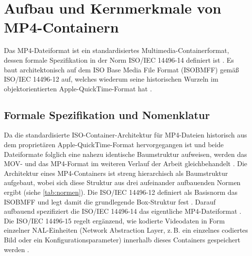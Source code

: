\section{Aufbau und Kernmerkmale von MP4-Containern}
\label{kap:aufbau_mp4}
\label{sec:aufbau_mp4}

Das MP4-Dateiformat ist ein standardisiertes Multimedia-Containerformat, dessen formale Spezifikation in der Norm ISO/IEC 14496-14 definiert ist \cite{iso_14496-14_2020}. Es baut architektonisch auf dem ISO Base Media File Format (ISOBMFF) gemäß ISO/IEC 14496-12 auf, welches wiederum seine historischen Wurzeln im objektorientierten Apple-QuickTime-Format hat \cite{apple_quicktime_2001}. 


\subsection{Formale Spezifikation und Nomenklatur}

Da die standardisierte ISO-Container-Architektur für MP4-Dateien historisch aus dem proprietären Apple-QuickTime-Format hervorgegangen ist und beide Dateiformate folglich eine nahezu identische Baumstruktur aufweisen, werden das MOV- und das MP4-Format im weiteren Verlauf der Arbeit gleichbehandelt \cite{apple_quicktime_2001, iso_14496-12_2022}. Die Architektur eines MP4-Containers ist streng hierarchisch als Baumstruktur aufgebaut, wobei sich diese Struktur aus drei aufeinander aufbauenden Normen ergibt (siehe \cref{tab:normen}). Die ISO/IEC 14496-12 definiert als Basisnorm das ISOBMFF und legt damit die grundlegende Box-Struktur fest \cite{iso_14496-12_2022}. Darauf aufbauend spezifiziert die ISO/IEC 14496-14 das eigentliche MP4-Dateiformat \cite{iso_14496-14_2020}. Die ISO/IEC 14496-15 regelt ergänzend, wie kodierte Videodaten in Form einzelner NAL-Einheiten (Network Abstraction Layer, z.\,B. ein einzelnes codiertes Bild oder ein Konfigurationsparameter) innerhalb dieses Containers gespeichert werden \cite{iso_14496-15_2024}.

